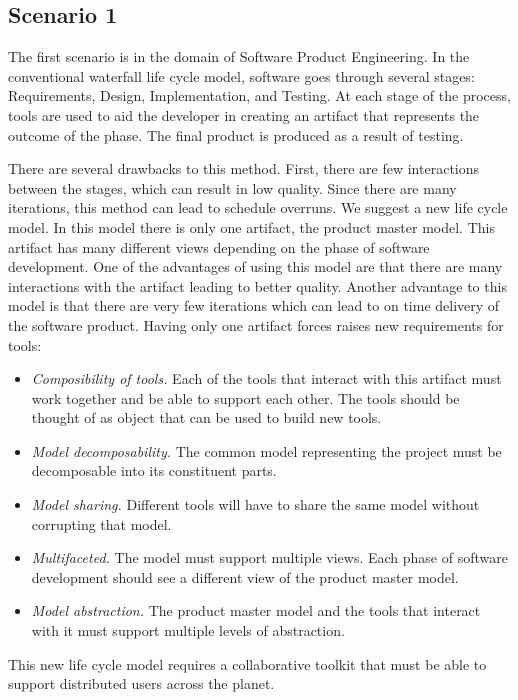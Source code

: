 \subsection{Scenario 1}

The first scenario is in the domain of Software Product Engineering.  In
the conventional waterfall life cycle model, software goes through several stages:
Requirements, Design, Implementation, and Testing.  At each stage of the
process, tools are used to aid the developer in creating an artifact that
represents the outcome of the phase.  The final product is produced 
as a result of testing. 

There are several drawbacks to this method.  First, there are
few interactions between the stages, which can result in low quality.  Since
there are many iterations, this method can lead to schedule overruns.  We
suggest a new life cycle model.  In this model there is only one artifact,
the product master model.  This artifact has many different views depending
on the phase of software development.  One of the advantages of using this
model are that there are many interactions with the artifact leading to better
quality.  Another advantage to this model is that there are very few iterations
which can lead to on time delivery of the software product.  Having only
one artifact forces raises new requirements for tools:

\begin{itemize}
\item {\em Composibility of tools.}  Each of the tools that interact with
  this artifact must work together and be able to support each other.
  The tools should be thought of as object that can be used to build
  new tools.
\item {\em Model decomposability.}  The common model representing the project
  must be decomposable into its constituent parts.
\item {\em Model sharing.}  Different tools will have to share the same
  model without corrupting that model.
\item {\em Multifaceted.}  The model must support multiple views.  Each
  phase of software development should see a different view of the product
  master model.
\item {\em Model abstraction.}  The product master model and the tools
  that interact with it must support multiple levels of abstraction.
\end{itemize}

This new life cycle model requires a collaborative toolkit that must be
able to support distributed users across the planet.

